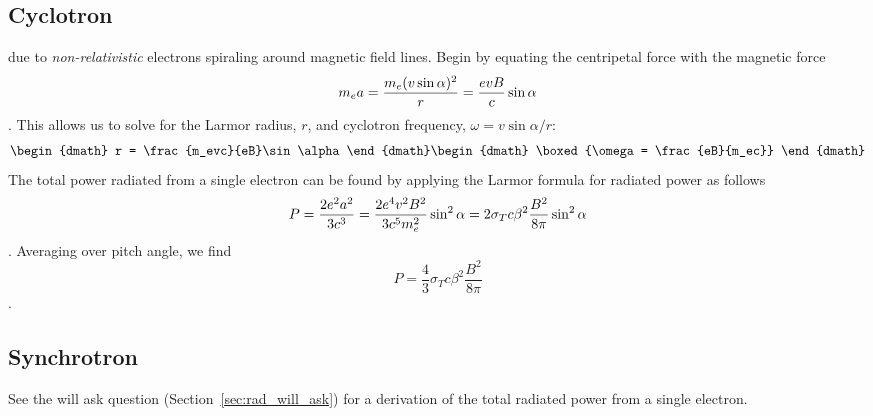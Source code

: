 \subsection{Cyclotron}
 due to \emph{non-relativistic} electrons spiraling around
magnetic field lines.  Begin by equating the centripetal force with the magnetic force
\begin{dmath*}
    m_ea = \frac{m_e (v\sin\alpha)^2}{r} \nolinebreak = \frac{evB}{c}\sin\alpha
\end{dmath*}.
This allows us to solve for the Larmor radius, $r$, and cyclotron frequency, $\omega=v\sin\alpha/r$:
\begin{dgroup*}
\begin{dmath}
    r = \frac{m_evc}{eB}\sin\alpha
\end{dmath}
\begin{dmath}
    \boxed{\omega = \frac{eB}{m_ec}}
\end{dmath}
\end{dgroup*}
The total power radiated from a single electron can be found by applying the Larmor formula
for radiated power as follows
\begin{dmath*}
    P = \frac{2e^2a^2}{3c^3} \nolinebreak = \frac{2e^4v^2B^2}{3c^5m_e^2} \sin^2\alpha \nolinebreak
      = 2\sigma_Tc\beta^2\frac{B^2}{8\pi}\sin^2\alpha
\end{dmath*}.
Averaging over pitch angle, we find
\begin{dmath*}\boxed{
    P = \frac{4}{3}\sigma_Tc\beta^2\frac{B^2}{8\pi}
}\end{dmath*}.

\subsection{Synchrotron}\label{sec:synchrotron}
See the will ask question (Section~\ref{sec:rad_will_ask})
for a derivation of the total radiated power from a single electron.  


